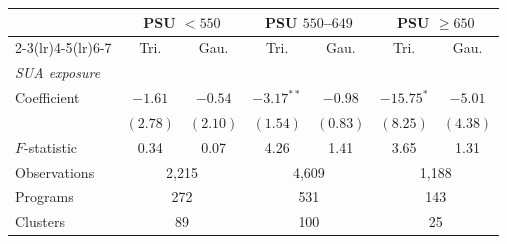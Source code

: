 \begin{tabular}{lcccccc}
\toprule
& \multicolumn{2}{c}{PSU \(<550\)} & \multicolumn{2}{c}{PSU \(550\)--\(649\)} & \multicolumn{2}{c}{PSU \(\geq650\)} \\
\cmidrule(lr){2-3}\cmidrule(lr){4-5}\cmidrule(lr){6-7}
& Tri. & Gau. & Tri. & Gau. & Tri. & Gau. \\
\midrule
\multicolumn{7}{l}{\textit{SUA exposure}} \\
\addlinespace[2pt]
Coefficient & \(-1.61\) & \(-0.54\) & \(-3.17^{**}\) & \(-0.98\) & \(-15.75^{*}\) & \(-5.01\) \\
 & \((2.78)\) & \((2.10)\) & \((1.54)\) & \((0.83)\) & \((8.25)\) & \((4.38)\) \\
\(F\)-statistic &  0.34 &  0.07 &  4.26 &  1.41 &  3.65 &  1.31 \\
Observations & \multicolumn{2}{c}{    2,215} & \multicolumn{2}{c}{    4,609} & \multicolumn{2}{c}{    1,188} \\
Programs & \multicolumn{2}{c}{      272} & \multicolumn{2}{c}{      531} & \multicolumn{2}{c}{      143} \\
Clusters & \multicolumn{2}{c}{       89} & \multicolumn{2}{c}{      100} & \multicolumn{2}{c}{       25} \\
\bottomrule
\end{tabular}
